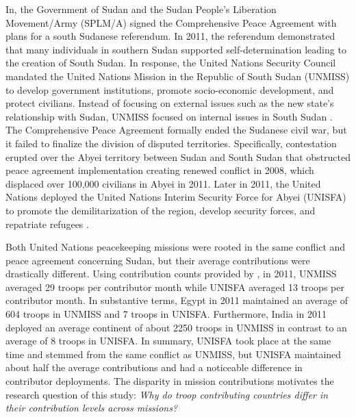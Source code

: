 \documentclass[12pt]{article}
\begin{document}
In, the Government of Sudan and the Sudan People's Liberation Movement/Army (SPLM/A) signed the Comprehensive Peace Agreement with plans for a south Sudanese referendum. In 2011, the referendum demonstrated that many individuals in southern Sudan supported self-determination leading to the creation of South Sudan. In response, the United Nations Security Council mandated the United Nations Mission in the Republic of South Sudan (UNMISS) to develop government institutions, promote socio-economic development, and protect civilians. Instead of focusing on external issues such as the new state's relationship with Sudan, UNMISS focused on internal issues in South Sudan \citep{PKO_UNMISS}. The Comprehensive Peace Agreement formally ended the Sudanese civil war, but it failed to finalize the division of disputed territories. Specifically, contestation erupted over the Abyei territory between Sudan and South Sudan that obstructed peace agreement implementation creating renewed conflict in 2008, which displaced over 100,000 civilians in Abyei in 2011. Later in 2011, the United Nations deployed the United Nations Interim Security Force for Abyei (UNISFA) to promote the demilitarization of the region, develop security forces, and repatriate refugees \citep{PKO_UNISFA}. 


Both United Nations peacekeeping missions were rooted in the same conflict and peace agreement concerning Sudan, but their average contributions were drastically different. Using contribution counts provided by \cite{perry2013}, in 2011, UNMISS averaged 29 troops per contributor month while UNISFA averaged 13 troops per contributor month. In substantive terms, Egypt in 2011 maintained an average of 604 troops in UNMISS and 7 troops in UNISFA. Furthermore, India in 2011 deployed an average continent of about 2250 troops in UNMISS in contrast to an average of 8 troops in UNISFA. In summary, UNISFA took place at the same time and stemmed from the same conflict as UNMISS, but UNISFA maintained about half the average contributions and had a noticeable difference in contributor deployments. The disparity in mission contributions motivates the research question of this study: \textit{Why do troop contributing countries differ in their contribution levels across missions?} 
\end{document}
